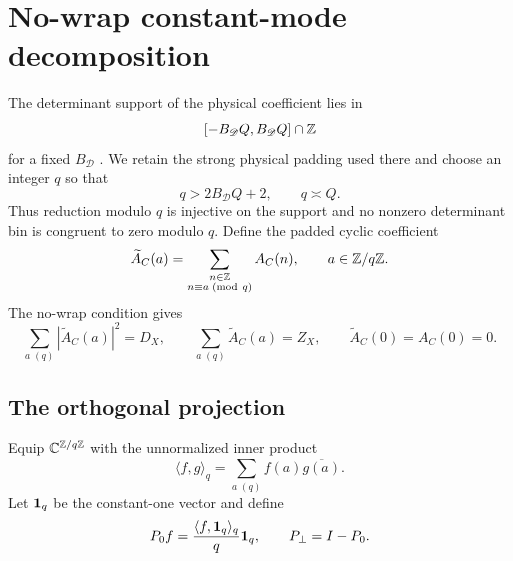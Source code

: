\section{No-wrap constant-mode decomposition}
\label{sec:constant-mode}

The determinant support of the physical coefficient lies in
\[
 [-B_{\mathscr D}Q,B_{\mathscr D}Q]\cap\mathbb Z
\]
for a fixed \(B_{\mathscr D}\) \citep{WangTPC32}.  We retain the
strong physical padding used there and choose an integer \(q\) so that
\begin{equation}
 q>2B_{\mathscr D}Q+2,
 \qquad q\asymp Q.
 \label{eq:constant-no-wrap-q}
\end{equation}
Thus reduction modulo \(q\) is injective on the support and no
nonzero determinant bin is congruent to zero modulo \(q\).  Define
the padded cyclic coefficient
\begin{equation}
 \widetilde A_C(a)
 =\sum_{\substack{n\in\mathbb Z\\n\equiv a\;(\mathrm{mod}\ q)}}A_C(n),
 \qquad a\in\mathbb Z/q\mathbb Z.
 \label{eq:constant-padded-A}
\end{equation}
The no-wrap condition gives
\begin{equation}
 \sum_{a\; (q)}|\widetilde A_C(a)|^2=D_X,
 \qquad
 \sum_{a\; (q)}\widetilde A_C(a)=Z_X,
 \qquad
 \widetilde A_C(0)=A_C(0)=0.
 \label{eq:constant-padded-identities}
\end{equation}

\subsection{The orthogonal projection}

Equip \(\mathbb C^{\mathbb Z/q\mathbb Z}\) with the unnormalized inner product
\[
 \langle f,g\rangle_q
 =\sum_{a\; (q)}f(a)\overline{g(a)}.
\]
Let \(\mathbf 1_q\) be the constant-one vector and define
\begin{equation}
 P_0f=\frac{\langle f,\mathbf 1_q\rangle_q}{q}\mathbf 1_q,
 \qquad
 P_\perp=I-P_0.
 \label{eq:constant-projections}
\end{equation}

